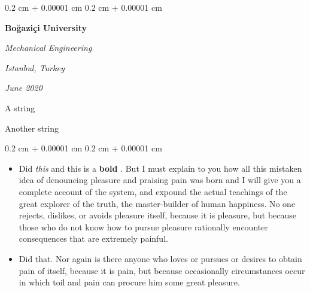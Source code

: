 \documentclass[10pt, letterpaper]{article}
\newenvironment{summary}{
    \begin{description}[
        topsep=0.10 cm,
        parsep=0.10 cm,
        partopsep=0pt,
        itemsep=0pt,
        leftmargin=0.4 cm + 10pt
    ]
}{
    \end{description}
} %
\newenvironment{highlights}{
    \begin{itemize}[
        topsep=0.10 cm,
        parsep=0.10 cm,
        partopsep=0pt,
        itemsep=0pt,
        leftmargin=0.4 cm + 10pt
    ]
}{
    \end{itemize}
} %
\newenvironment{onecolentry}{
    \begin{adjustwidth}{
        0.2 cm + 0.00001 cm
    }{
        0.2 cm + 0.00001 cm
    }
}{
    \end{adjustwidth}
} %
\newenvironment{twocolentry}[2][]{
    \onecolentry
    \def\secondColumn{#2}
    \setcolumnwidth{\fill, 4.5 cm}
    \begin{paracol}{2}
}{
    \switchcolumn \raggedleft \secondColumn
    \end{paracol}
    \endonecolentry
} %
\let\hrefWithoutArrow\href
\renewcommand{\href}[2]{\hrefWithoutArrow{#1}{\ifthenelse{\equal{#2}{}}{ }{#2 }\raisebox{.15ex}{\footnotesize \faExternalLink*}}}
\begin{document}
        \begin{twocolentry}{
        \textit{Istanbul, Turkey}    
            
        \textit{June 2020}}
            \textbf{Boğaziçi University}

            \textit{Mechanical Engineering}
        \end{twocolentry}
            \begin{summary}
                \item A string
                \item Another string
            \end{summary}
        \vspace{0.10 cm}
        \begin{onecolentry}
            \begin{highlights}
                \item Did \textit{this} and this is a \textbf{bold} \href{https://example.com}{link}. But I must explain to you how all this mistaken idea of denouncing pleasure and praising pain was born and I will give you a complete account of the system, and expound the actual teachings of the great explorer of the truth, the master-builder of human happiness. No one rejects, dislikes, or avoids pleasure itself, because it is pleasure, but because those who do not know how to pursue pleasure rationally encounter consequences that are extremely painful.
                \item Did that. Nor again is there anyone who loves or pursues or desires to obtain pain of itself, because it is pain, but because occasionally circumstances occur in which toil and pain can procure him some great pleasure.
            \end{highlights}
        \end{onecolentry}


        \vspace{0.2 cm}
\end{document}
